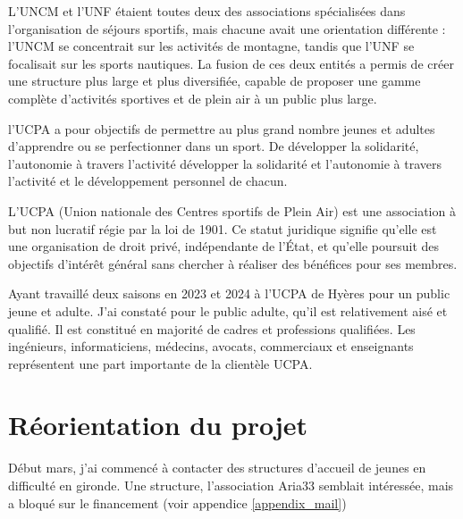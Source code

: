 \documentclass[12pt,a4paper]{report}
\begin{document}
L'UNCM et l'UNF étaient toutes deux des associations spécialisées
dans l'organisation de  séjours sportifs, mais chacune avait une
orientation différente : l'UNCM se concentrait sur les activités 
de montagne, tandis que l'UNF se focalisait sur les sports nautiques. 
La fusion de ces deux entités a permis de créer une structure plus 
large et plus diversifiée, capable de proposer une gamme complète 
d'activités sportives et de plein air à un public plus large.


l'UCPA a pour objectifs de permettre au plus grand nombre jeunes et adultes
d'apprendre ou se perfectionner dans un sport. De développer la solidarité,
l'autonomie à travers l'activité développer la solidarité et l'autonomie
à travers l'activité et le développement personnel de chacun.



L'UCPA (Union nationale des Centres sportifs de Plein Air) est une association à but
non lucratif régie par la loi de 1901. Ce statut juridique signifie qu'elle est une
organisation de droit privé, indépendante de l'État, et qu'elle poursuit des 
objectifs d'intérêt général sans chercher à réaliser des bénéfices pour ses membres.


Ayant travaillé  deux saisons en 2023 et 2024 à l'UCPA de Hyères pour 
un public jeune et adulte. J'ai  constaté pour le public 
adulte, qu'il est relativement aisé et qualifié. Il est
constitué en majorité de cadres et professions qualifiées. Les
ingénieurs, informaticiens, médecins, avocats, commerciaux et enseignants
représentent une part importante de la clientèle UCPA.
\section{Réorientation du projet}

Début mars, j'ai commencé à contacter des structures d'accueil de jeunes 
en difficulté en gironde. Une structure, l'association Aria33 semblait 
intéressée, mais a bloqué sur le financement (voir appendice \ref{appendix_mail})
\end{document}
